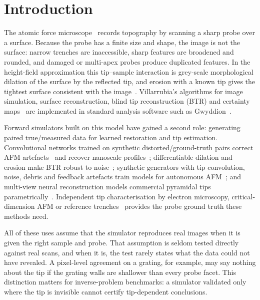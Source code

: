 \documentclass[preprint,12pt]{elsarticle}
\begin{document}
\linenumbers

\section{Introduction}
\label{sec:intro}

The atomic force microscope~\cite{binnig1986} records topography by scanning a sharp probe over a
surface. Because the probe has a finite size and shape, the image is not the surface: narrow
trenches are inaccessible, sharp features are broadened and rounded, and damaged or multi-apex
probes produce duplicated features. In the height-field approximation this tip--sample
interaction is grey-scale morphological dilation of the surface by the reflected tip, and
erosion with a known tip gives the tightest surface consistent with the image~\cite{keller1991,
villarrubia1997}. Villarrubia's algorithms for image simulation, surface reconstruction, blind tip
reconstruction (BTR) and certainty maps~\cite{villarrubia1997} are implemented in standard analysis
software such as Gwyddion~\cite{necas2012,gwyddionguide}.

Forward simulators built on this model have gained a second role: generating paired
true/measured data for learned restoration and tip estimation. Convolutional networks trained on
synthetic distorted/ground-truth pairs correct AFM artefacts~\cite{kocur2023} and recover nanoscale
profiles~\cite{bonagiri2024}; differentiable dilation and erosion make BTR robust to
noise~\cite{matsunaga2023}; synthetic generators with tip convolution, noise, debris and feedback
artefacts train models for autonomous AFM~\cite{millansolsona2026}; and multi-view neural
reconstruction models commercial pyramidal tips parametrically~\cite{chen2024}. Independent tip
characterisation by electron microscopy, critical-dimension AFM or reference
trenches~\cite{dai2020,trench2025} provides the probe ground truth these methods need.

All of these uses assume that the simulator reproduces real images when it is given the right
sample and probe. That assumption is seldom tested directly against real scans, and when it is,
the test rarely states what the data could not have revealed. A pixel-level agreement on a
grating, for example, may say nothing about the tip if the grating walls are shallower than every
probe facet. This distinction matters for inverse-problem benchmarks: a simulator validated only
where the tip is invisible cannot certify tip-dependent conclusions.
\end{document}
